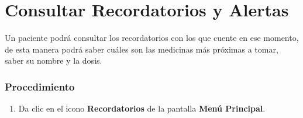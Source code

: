 \section{Consultar Recordatorios y Alertas}

Un paciente podrá consultar los recordatorios con los que cuente en ese momento, de esta manera podrá saber cuáles son las medicinas más próximas a tomar, saber su nombre y la dosis.

\subsubsection{Procedimiento}
\begin{enumerate}
	
	\item Da clic en el icono \textbf{Recordatorios} de la pantalla \textbf{Menú Principal}.


\end{enumerate}
